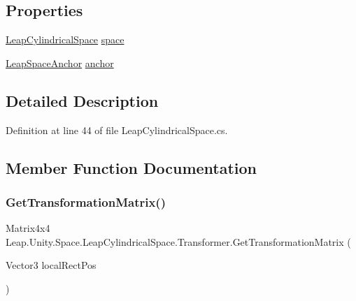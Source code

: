 \subsection*{Properties}
\begin{DoxyCompactItemize}
\item 
\mbox{\hyperlink{class_leap_1_1_unity_1_1_space_1_1_leap_cylindrical_space}{Leap\+Cylindrical\+Space}} \mbox{\hyperlink{class_leap_1_1_unity_1_1_space_1_1_leap_cylindrical_space_1_1_transformer_a06f1107a2386c409efa1e2b912974634}{space}}
\item 
\mbox{\hyperlink{class_leap_1_1_unity_1_1_space_1_1_leap_space_anchor}{Leap\+Space\+Anchor}} \mbox{\hyperlink{class_leap_1_1_unity_1_1_space_1_1_leap_cylindrical_space_1_1_transformer_a9b0c7e65513d10439dc35f983cb90a38}{anchor}}
\end{DoxyCompactItemize}


\subsection{Detailed Description}


Definition at line 44 of file Leap\+Cylindrical\+Space.\+cs.



\subsection{Member Function Documentation}
\mbox{\label{class_leap_1_1_unity_1_1_space_1_1_leap_cylindrical_space_1_1_transformer_a9b84b4d4ae446344b19c6c6218e1a249}} 
\subsubsection{\texorpdfstring{GetTransformationMatrix()}{GetTransformationMatrix()}}
{\footnotesize\ttfamily Matrix4x4 Leap.\+Unity.\+Space.\+Leap\+Cylindrical\+Space.\+Transformer.\+Get\+Transformation\+Matrix (\begin{DoxyParamCaption}\item[{Vector3}]{local\+Rect\+Pos }\end{DoxyParamCaption})}




